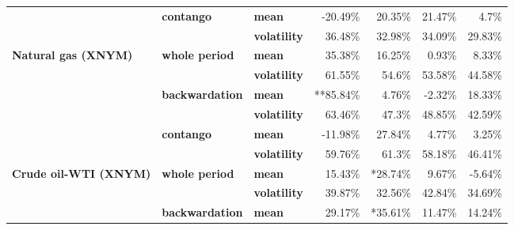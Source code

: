 \documentclass[
  authoryear,
  preprint,
  3p]{elsarticle}
\begin{document}
\begin{longtable}[t]{>{}l>{}l>{}l>{}r>{}r>{}r>{}r}
\textbf{} & \textbf{contango} & \textbf{mean} & \textcolor[HTML]{4285f4}{-20.49\%} & \textcolor[HTML]{4285f4}{20.35\%} & \textcolor[HTML]{4285f4}{21.47\%} & \textcolor[HTML]{4285f4}{4.7\%}\\
\textbf{} & \textbf{} & \textbf{volatility} & \textcolor[HTML]{4285f4}{36.48\%} & \textcolor[HTML]{4285f4}{32.98\%} & \textcolor[HTML]{4285f4}{34.09\%} & \textcolor[HTML]{4285f4}{29.83\%}\\
\addlinespace
\textbf{Natural gas (XNYM)} & \textbf{whole period} & \textbf{mean} & \textcolor[HTML]{4285f4}{35.38\%} & \textcolor[HTML]{4285f4}{16.25\%} & \textcolor[HTML]{4285f4}{0.93\%} & \textcolor[HTML]{4285f4}{8.33\%}\\
\textbf{} & \textbf{} & \textbf{volatility} & \textcolor[HTML]{4285f4}{61.55\%} & \textcolor[HTML]{4285f4}{54.6\%} & \textcolor[HTML]{4285f4}{53.58\%} & \textcolor[HTML]{4285f4}{44.58\%}\\
\textbf{} & \textbf{backwardation} & \textbf{mean} & \textcolor[HTML]{4285f4}{**85.84\%} & \textcolor[HTML]{4285f4}{4.76\%} & \textcolor[HTML]{4285f4}{-2.32\%} & \textcolor[HTML]{4285f4}{18.33\%}\\
\textbf{} & \textbf{} & \textbf{volatility} & \textcolor[HTML]{4285f4}{63.46\%} & \textcolor[HTML]{4285f4}{47.3\%} & \textcolor[HTML]{4285f4}{48.85\%} & \textcolor[HTML]{4285f4}{42.59\%}\\
\textbf{} & \textbf{contango} & \textbf{mean} & \textcolor[HTML]{4285f4}{-11.98\%} & \textcolor[HTML]{4285f4}{27.84\%} & \textcolor[HTML]{4285f4}{4.77\%} & \textcolor[HTML]{4285f4}{3.25\%}\\
\addlinespace
\textbf{} & \textbf{} & \textbf{volatility} & \textcolor[HTML]{4285f4}{59.76\%} & \textcolor[HTML]{4285f4}{61.3\%} & \textcolor[HTML]{4285f4}{58.18\%} & \textcolor[HTML]{4285f4}{46.41\%}\\
\textbf{Crude oil-WTI (XNYM)} & \textbf{whole period} & \textbf{mean} & \textcolor[HTML]{4285f4}{15.43\%} & \textcolor[HTML]{4285f4}{*28.74\%} & \textcolor[HTML]{4285f4}{9.67\%} & \textcolor[HTML]{4285f4}{-5.64\%}\\
\textbf{} & \textbf{} & \textbf{volatility} & \textcolor[HTML]{4285f4}{39.87\%} & \textcolor[HTML]{4285f4}{32.56\%} & \textcolor[HTML]{4285f4}{42.84\%} & \textcolor[HTML]{4285f4}{34.69\%}\\
\textbf{} & \textbf{backwardation} & \textbf{mean} & \textcolor[HTML]{4285f4}{29.17\%} & \textcolor[HTML]{4285f4}{*35.61\%} & \textcolor[HTML]{4285f4}{11.47\%} & \textcolor[HTML]{4285f4}{14.24\%}\\

\end{longtable}
\end{document}
